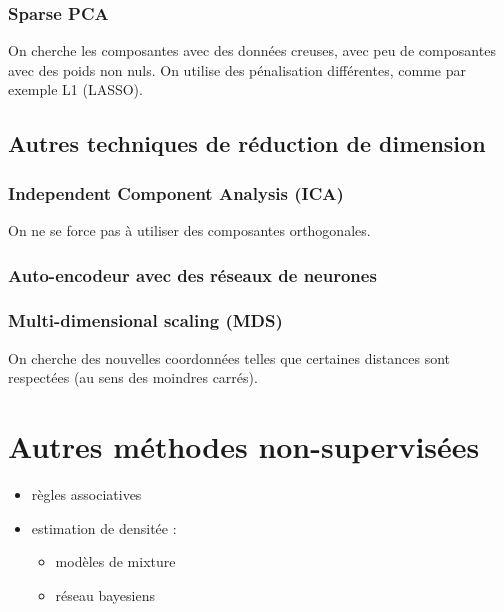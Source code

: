 		
		\subsubsection{Sparse PCA}
		
		On cherche les composantes avec des données creuses, avec peu de composantes avec des poids non nuls. On utilise des pénalisation différentes, comme par exemple L1 (LASSO).
		
	\subsection{Autres techniques de réduction de dimension}
	
		\subsubsection{Independent Component Analysis (ICA)}
		
		On ne se force pas à utiliser des composantes orthogonales.
		
		
		\subsubsection{Auto-encodeur avec des réseaux de neurones}
		
		
		\subsubsection{Multi-dimensional scaling (MDS)}
		
		On cherche des nouvelles coordonnées telles que certaines distances sont respectées (au sens des moindres carrés).
		
\section{Autres méthodes non-supervisées}

\begin{itemize}
	\item règles associatives
	\item estimation de densitée :
	
	\begin{itemize}
		\item modèles de mixture
		\item réseau bayesiens
	\end{itemize}
\end{itemize}